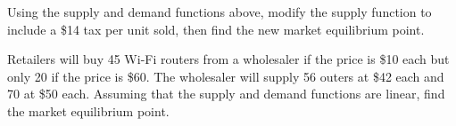 \documentclass[../mathNotesPreamble]{subfiles}
\begin{document}
  \begin{ex*}
    Using the supply and demand functions above, modify the supply function to include a \$14 tax per unit sold, then find the new market equilibrium point.
  \end{ex*}
  \pagebreak

  \begin{ex*}
    Retailers will buy 45 Wi-Fi routers from a wholesaler if the price is \$10 each but only 20 if the price is \$60. The wholesaler will supply 56 outers at \$42 each and 70 at \$50 each. Assuming that the supply and demand functions are linear, find the market equilibrium point.
  \end{ex*}
  \pagebreak

  \pagebreak
\end{document}

